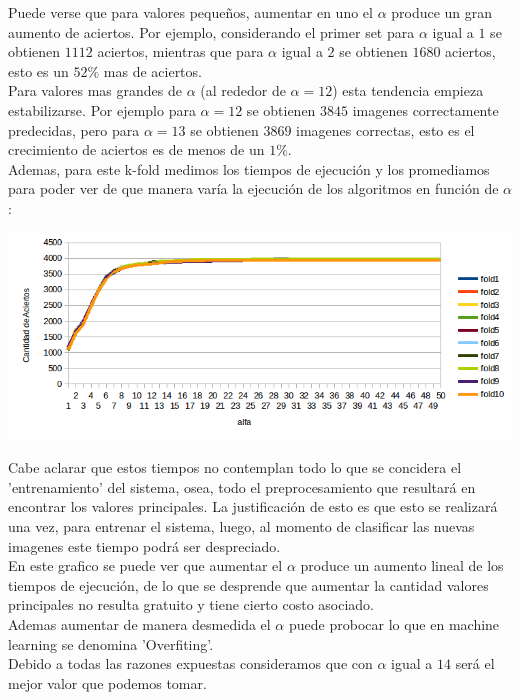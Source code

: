 Puede verse que para valores pequeños, aumentar en uno el $\alpha$ produce un gran aumento de aciertos. Por ejemplo, considerando el primer set para $\alpha$ igual a $1$ se obtienen $1112$ aciertos, mientras que para $\alpha$ igual a $2$ se obtienen $1680$ aciertos, esto es un $52\%$ mas de aciertos.
\\
Para valores mas grandes de $\alpha$ (al rededor de $\alpha = 12$) esta tendencia empieza estabilizarse. Por ejemplo para $\alpha = 12$ se obtienen $3845$ imagenes correctamente predecidas, pero para $\alpha = 13$ se obtienen $3869$ imagenes correctas, esto es el crecimiento de aciertos es de menos de un $1\%$.
\\
Ademas, para este k-fold medimos los tiempos de ejecución y los promediamos para poder ver de que manera varía la ejecución de los algoritmos en función de $\alpha$:

\begin{center}
\includegraphics[scale=0.68]{nuevosResultados/pca/pca1.png}
\end{center}


Cabe aclarar que estos tiempos no contemplan todo lo que se concidera el 'entrenamiento' del sistema, osea, todo el preprocesamiento que resultará en encontrar los valores principales. La justificación de esto es que esto se realizará una vez, para entrenar el sistema, luego, al momento de clasificar las nuevas imagenes este tiempo podrá ser despreciado.
\\
En este grafico se puede ver que aumentar el $\alpha$ produce un aumento lineal de los tiempos de ejecución, de lo que se desprende que aumentar la cantidad valores principales no resulta gratuito y tiene cierto costo asociado.
\\
Ademas aumentar de manera desmedida el $\alpha$ puede probocar lo que en machine learning se denomina 'Overfiting'.
\inventarReferencia
\\
Debido a todas las razones expuestas consideramos que con $\alpha$ igual a $14$ será el mejor valor que podemos tomar.
\\
